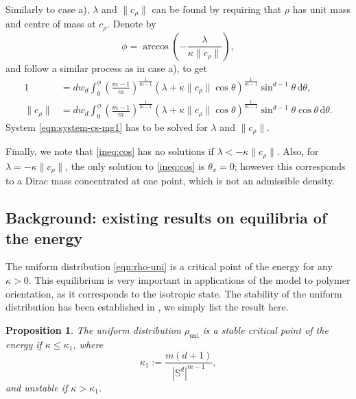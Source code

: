 \documentclass[11pt]{amsart}
\newtheorem{proposition}{Proposition}[section]
\newcommand{\bbs}{\mathbb S}
\def\d{\mathrm{d}}
\newcommand{\rhou}{\rho_{\mathrm{uni}}}
\newcommand{\dm}{d} %
\begin{document}
Similarly to case a), $\lambda$ and $\|c_\rho\|$ can be found by requiring that $\rho$ has unit mass and centre of mass at $c_\rho$. Denote by 
\begin{equation}
\label{eqn:phi-notation}
    \phi = \arccos\left(-\frac{\lambda}{\kappa\|c_\rho\|}\right),
\end{equation}
and follow a similar process as in case a), to get
\begin{equation}
\label{eqn:system-cs-mg1}
\begin{aligned}
1&=\dm w_\dm\int_0^\phi \left(\frac{m-1}{m}\right)^{\frac{1}{m-1}}\left(\lambda+\kappa\|c_\rho\|\cos\theta\right)^{\frac{1}{m-1}}\sin^{\dm-1}\theta \, \d\theta, \\
\|c_\rho\|& =\dm w_\dm\int_0^\phi \left(\frac{m-1}{m}\right)^{\frac{1}{m-1}}\left(\lambda+\kappa\|c_\rho\|\cos\theta\right)^{\frac{1}{m-1}}\sin^{\dm-1}\theta \cos\theta \, \d\theta.
\end{aligned}
\end{equation}
System \eqref{eqn:system-cs-mg1} has to be solved for $\lambda$ and $\|c_\rho\|$.

Finally, we note that \eqref{ineq:cos} has no solutions if $\lambda < -\kappa\|c_\rho\|$. Also, for $\lambda=-\kappa\|c_\rho\|$, the only solution to \eqref{ineq:cos} is $\theta_x=0$; however this corresponds to a Dirac mass concentrated at one point, which is not an admissible density. 

\subsection{Background: existing results on equilibria of the energy}
\label{subsect:equil-review}

The uniform distribution \eqref{eqn:rho-uni} is a critical point of the energy for any $\kappa>0$. This equilibrium is very important in applications of the model to polymer orientation, as it corresponds to the isotropic state. The stability of the uniform distribution has been established in \cite{FePaVa2025}, we simply list the result here.

\begin{proposition} \cite[Proposition 3.1]{FePaVa2025}
\label{prop:stab-unif}
The uniform distribution $\rhou$ is a stable critical point of the energy if $\kappa \leq \kappa_1$, where
\begin{equation}
\label{eqn:kappa1}
\kappa_1:= \frac{m (\dm+1)}{|\bbs^\dm|^{m-1}},
\end{equation}
and unstable if $\kappa>\kappa_1$.
\end{proposition}
\end{document}
